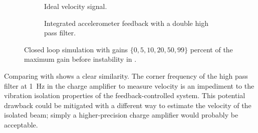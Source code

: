 \begin{figure}
  \begin{wide}
  \begin{subfigure}
    \caption{Ideal velocity signal.}
  \end{subfigure}
  \begin{subfigure}
    \caption{Integrated accelerometer feedback with a double high pass filter.}
  \end{subfigure}
  \end{wide}
  \caption{Closed loop simulation with gains $\{0, 5, 10, 20, 50, 99\}$ percent of the maximum gain before instability in .}
\end{figure}

Comparing  with  shows a clear
similarity. The corner frequency of the high pass filter at \SI{1}{Hz} in the
charge amplifier to measure velocity is an impediment to the vibration
isolation properties of the feedback-controlled system. This potential
drawback could be mitigated with a different way to estimate the velocity of
the isolated beam; simply a higher-precision charge amplifier would probably
be acceptable.



